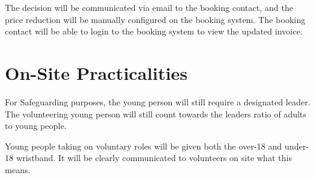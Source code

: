 \documentclass[a4paper, 11pt]{article}
\begin{document}
    The decision will be communicated via email to the booking contact, and the price reduction will be manually configured on the booking system. The booking contact will be able to login to the booking system to view the updated invoice. 

    \section{On-Site Practicalities}
    For Safeguarding purposes, the young person will still require a designated leader. The volunteering young person will still count towards the leaders ratio of adults to young people.

    Young people taking on voluntary roles will be given both the over-18 and under-18 wristband. It will be clearly communicated to volunteers on site what this means. 

    \backPage
\end{document}
